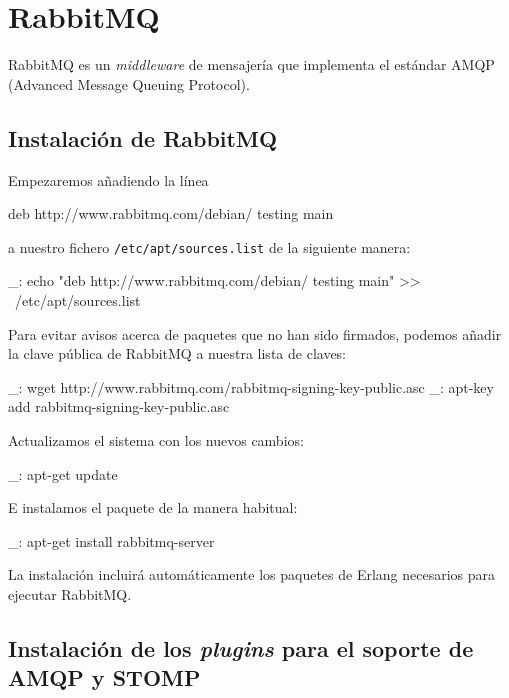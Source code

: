 \chapter{RabbitMQ}
\label{anx:rabbitmq}


RabbitMQ es un \emph{middleware} de mensajería que implementa el estándar AMQP (Advanced Message Queuing Protocol).


\section{Instalación de RabbitMQ}

Empezaremos añadiendo la línea

\begin{bashcode}
deb http://www.rabbitmq.com/debian/ testing main
\end{bashcode}

a nuestro fichero \texttt{/etc/apt/sources.list} de la siguiente manera:

\begin{bashcode}
_: echo "deb http://www.rabbitmq.com/debian/ testing main" >> \
/etc/apt/sources.list
\end{bashcode}

Para evitar avisos acerca de paquetes que no han sido firmados, podemos añadir la clave pública de RabbitMQ a nuestra lista de claves:

\begin{bashcode}
_: wget http://www.rabbitmq.com/rabbitmq-signing-key-public.asc
_: apt-key add rabbitmq-signing-key-public.asc
\end{bashcode}

Actualizamos el sistema con los nuevos cambios:

\begin{bashcode}
_: apt-get update
\end{bashcode}

E instalamos el paquete de la manera habitual:

\begin{bashcode}
_: apt-get install rabbitmq-server
\end{bashcode}

La instalación incluirá automáticamente los paquetes de Erlang necesarios para ejecutar RabbitMQ.


\section{Instalación de los \emph{plugins} para el soporte de AMQP y STOMP}

